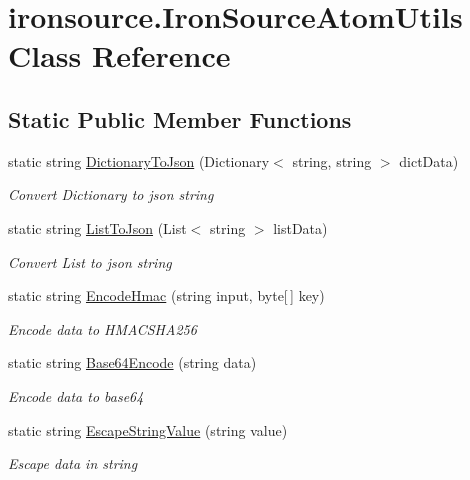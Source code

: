 \hypertarget{classironsource_1_1_iron_source_atom_utils}{}\section{ironsource.\+Iron\+Source\+Atom\+Utils Class Reference}
\label{classironsource_1_1_iron_source_atom_utils}
\subsection*{Static Public Member Functions}
\begin{DoxyCompactItemize}
\item 
static string \hyperlink{classironsource_1_1_iron_source_atom_utils_a0d02bab83f1db32c64e8470bb6d3d20f}{Dictionary\+To\+Json} (Dictionary$<$ string, string $>$ dict\+Data)
\begin{DoxyCompactList}\small\item\em Convert Dictionary to json string \end{DoxyCompactList}\item 
static string \hyperlink{classironsource_1_1_iron_source_atom_utils_ae086146bd3e85757444903ff72f57505}{List\+To\+Json} (List$<$ string $>$ list\+Data)
\begin{DoxyCompactList}\small\item\em Convert List to json string \end{DoxyCompactList}\item 
static string \hyperlink{classironsource_1_1_iron_source_atom_utils_a24bc5d44f0f12d49ced06d58cccac484}{Encode\+Hmac} (string input, byte\mbox{[}$\,$\mbox{]} key)
\begin{DoxyCompactList}\small\item\em Encode data to H\+M\+A\+C\+S\+H\+A256 \end{DoxyCompactList}\item 
static string \hyperlink{classironsource_1_1_iron_source_atom_utils_ae82cd7b4df396752b2c3f1429d873d28}{Base64\+Encode} (string data)
\begin{DoxyCompactList}\small\item\em Encode data to base64 \end{DoxyCompactList}\item 
static string \hyperlink{classironsource_1_1_iron_source_atom_utils_aa39b046c50af6e53bb50f57a075a8fa1}{Escape\+String\+Value} (string value)
\begin{DoxyCompactList}\small\item\em Escape data in string \end{DoxyCompactList}\end{DoxyCompactItemize}


